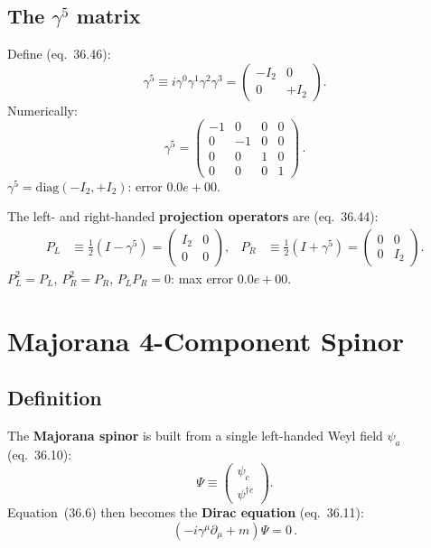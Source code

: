 \documentclass[12pt]{article}
\newcommand{\verified}[1]{\textcolor{verifygreen}{\checkmark\; #1}}
\begin{document}
\subsection{The \texorpdfstring{$\gamma^5$}{gamma5} matrix}

Define (eq.~36.46):
\begin{equation}
  \gamma^5 \equiv i\gamma^0\gamma^1\gamma^2\gamma^3
  = \begin{pmatrix}-I_2 & 0 \\ 0 & +I_2\end{pmatrix}.
  \tag{36.43}
\end{equation}
Numerically:
\[
  \gamma^5 = \begin{pmatrix}-1 & 0 & 0 & 0 \\ 0 & -1 & 0 & 0 \\ 0 & 0 & 1 & 0 \\ 0 & 0 & 0 & 1\end{pmatrix}\,.
\]
\verified{$\gamma^5 = \mathrm{diag}(-I_2,+I_2)$: error $0.0e+00$.}

\medskip
\noindent The left- and right-handed \textbf{projection operators} are (eq.~36.44):
\begin{align}
  P_L &\equiv \tfrac{1}{2}(I - \gamma^5)
     = \begin{pmatrix}I_2&0\\0&0\end{pmatrix},
  &
  P_R &\equiv \tfrac{1}{2}(I + \gamma^5)
     = \begin{pmatrix}0&0\\0&I_2\end{pmatrix}.
  \tag{36.44}
\end{align}
\verified{$P_L^2=P_L$, $P_R^2=P_R$, $P_LP_R=0$: max error $0.0e+00$.}

\section{Majorana 4-Component Spinor}

\subsection{Definition}

The \textbf{Majorana spinor} is built from a single left-handed Weyl field $\psi_a$
(eq.~36.10):
\begin{equation}
  \Psi \equiv \begin{pmatrix}\psi_c\\\psi^{\dagger\dot{c}}\end{pmatrix}.
  \tag{36.10}
\end{equation}
Equation~(36.6) then becomes the \textbf{Dirac equation} (eq.~36.11):
\begin{equation}
  \boxed{(-i\gamma^\mu\partial_\mu + m)\Psi = 0\,.}
  \tag{36.11}
\end{equation}
\end{document}
